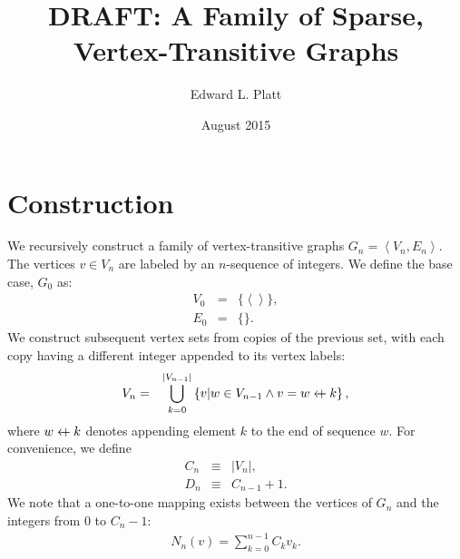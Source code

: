 \documentclass{article}
\title{DRAFT: A Family of Sparse, Vertex-Transitive Graphs}
\author{Edward L. Platt}
\date{August 2015}
\newcommand{\la}{\left\langle}
\newcommand{\ra}{\right\rangle}
\newcommand{\beq}{\begin{eqnarray}}
\newcommand{\eeq}{\end{eqnarray}}
\newcommand{\append}{\leftarrow{\mkern-18mu}{+}\:}
\begin{document}
\maketitle

\section{Construction}

We recursively construct a family of vertex-transitive graphs
$G_n = \la V_n, E_n \ra$.
The vertices $v \in V_n$ are labeled by an $n$-sequence of integers.
We define the base case, $G_0$ as:
\beq
V_0 &=& \{\la \ra\}, \\
E_0 &=& \{\}.
\eeq
We construct subsequent vertex sets from copies of the previous set,
with each copy having a different integer appended to its vertex labels:
\beq
\label{eq:vn}
V_n &=& \bigcup_{k = 0}^{|V_{n-1}|}
\left\{ v | w \in V_{n-1} \land v = w \append k \right\},
\eeq
where $w \append k$ denotes appending element $k$ to the end of sequence $w$.
For convenience, we define
\beq
C_n &\equiv& |V_n|, \\
D_n &\equiv& C_{n-1} + 1.
\eeq
We note that a one-to-one mapping exists between the vertices of $G_n$ and the
integers from $0$ to $C_n - 1$:
\beq
N_n(v) = \sum_{k=0}^{n-1} C_k v_k.
\eeq
\end{document}
